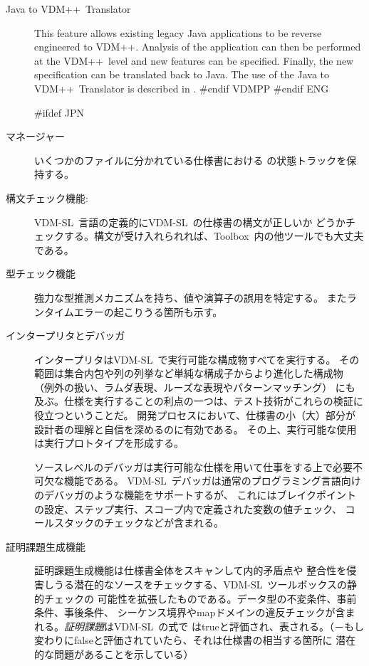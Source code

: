 \documentclass[\pformat,12pt]{article}
\def\vdmpp{{\small VDM}++}
\newcommand{\vdmslpp}{VDM-SL}
\newcommand{\Toolbox}{Toolbox}
\newcommand{\vdmslpp}{VDM++}
\newcommand{\Toolbox}{Toolbox}
\begin{document}
\begin{description}
\item[Java to \vdmpp\ Translator] This feature allows existing legacy Java
  applications to be reverse engineered to \vdmpp. Analysis of the
  application can then be performed at the \vdmpp\ level and new
  features can be specified. Finally, the new specification can be
  translated back to Java. The use of the Java to \vdmpp\ Translator
  is described in \cite{Java2VDMMan-CSK}.
#endif VDMPP
#endif ENG

#ifdef JPN
\item[マネージャー] いくつかのファイルに分かれている仕様書における
の状態トラックを保持する。

\item[構文チェック機能:] \vdmslpp\ 言語の定義的に\vdmslpp\ の仕様書の構文が正しいか
どうかチェックする。構文が受け入れられれば、\Toolbox\ 内の他ツールでも大丈夫である。

\item[型チェック機能]
  強力な型推測メカニズムを持ち、値や演算子の誤用を特定する。
またランタイムエラーの起こりうる箇所も示す。

\item[インタープリタとデバッガ] インタープリタは\vdmslpp\ で実行可能な構成物すべてを実行する。
その範囲は集合内包や列の列挙など単純な構成子からより進化した構成物
（例外の扱い、ラムダ表現、ルーズな表現やパターンマッチング）
にも及ぶ。仕様を実行することの利点の一つは、テスト技術がこれらの検証に役立つということだ。
開発プロセスにおいて、仕様書の小（大）部分が設計者の理解と自信を深めるのに有効である。
その上、実行可能な使用は実行プロトタイプを形成する。

ソースレベルのデバッガは実行可能な仕様を用いて仕事をする上で必要不可欠な機能である。
\vdmslpp\ デバッガは通常のプログラミング言語向けのデバッガのような機能をサポートするが、
これにはブレイクポイントの設定、ステップ実行、スコープ内で定義された変数の値チェック、
コールスタックのチェックなどが含まれる。

\item[証明課題生成機能] 証明課題生成機能は仕様書全体をスキャンして内的矛盾点や
整合性を侵害しうる潜在的なソースをチェックする、\vdmslpp\ ツールボックスの静的チェックの
可能性を拡張したものである。データ型の不変条件、事前条件、事後条件、
シーケンス境界やmapドメインの違反チェックが含まれる。\emph{証明課題}は\vdmslpp\ の式で
はtrueと評価され、表される。（－もし変わりにfalseと評価されていたら、それは仕様書の相当する箇所に
潜在的な問題があることを示している）


\end{description}
\end{document}

